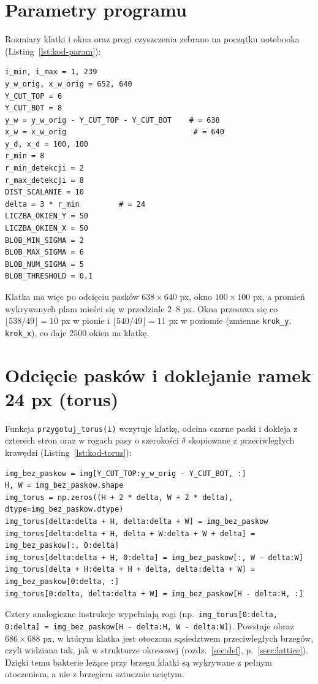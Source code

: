 \documentclass[12pt,a4paper,twoside,openright]{report}
\theoremstyle{definition}
\theoremstyle{remark}
\begin{document}
{\section{Parametry programu}
Rozmiary klatki i okna oraz progi czyszczenia zebrano na początku notebooka (Listing~\ref{lst:kod-param}):
\begin{lstlisting}[style=pykod,caption={Parametry programu: rozmiary klatki i okna oraz progi czyszczenia},label={lst:kod-param}]
i_min, i_max = 1, 239
y_w_orig, x_w_orig = 652, 640
Y_CUT_TOP = 6
Y_CUT_BOT = 8
y_w = y_w_orig - Y_CUT_TOP - Y_CUT_BOT    # = 638
x_w = x_w_orig                             # = 640
y_d, x_d = 100, 100
r_min = 8
r_min_detekcji = 2
r_max_detekcji = 8
DIST_SCALANIE = 10
delta = 3 * r_min         # = 24
LICZBA_OKIEN_Y = 50
LICZBA_OKIEN_X = 50
BLOB_MIN_SIGMA = 2
BLOB_MAX_SIGMA = 6
BLOB_NUM_SIGMA = 5
BLOB_THRESHOLD = 0.1
\end{lstlisting}
Klatka ma więc po odcięciu pasków $638\times640$ px, okno $100\times100$ px, a promień wykrywanych plam mieści się w przedziale $2$--$8$ px. Okna przesuwa się co $\lfloor538/49\rfloor=10$ px w pionie i $\lfloor540/49\rfloor=11$ px w poziomie (zmienne \texttt{krok\_y}, \texttt{krok\_x}), co daje $2500$ okien na klatkę.

\section{Odcięcie pasków i doklejanie ramek 24 px (torus)}
Funkcja \texttt{przygotuj\_torus(i)} wczytuje klatkę, odcina czarne paski i dokleja z czterech stron oraz w rogach pasy o szerokości $\delta$ skopiowane z przeciwległych krawędzi (Listing~\ref{lst:kod-torus}):
\begin{lstlisting}[style=pykod,caption={Odcięcie pasków i doklejanie ramek $\delta=24$ px (budowa torusa)},label={lst:kod-torus}]
img_bez_paskow = img[Y_CUT_TOP:y_w_orig - Y_CUT_BOT, :]
H, W = img_bez_paskow.shape
img_torus = np.zeros((H + 2 * delta, W + 2 * delta), dtype=img_bez_paskow.dtype)
img_torus[delta:delta + H, delta:delta + W] = img_bez_paskow
img_torus[delta:delta + H, delta + W:delta + W + delta] = img_bez_paskow[:, 0:delta]
img_torus[delta:delta + H, 0:delta] = img_bez_paskow[:, W - delta:W]
img_torus[delta + H:delta + H + delta, delta:delta + W] = img_bez_paskow[0:delta, :]
img_torus[0:delta, delta:delta + W] = img_bez_paskow[H - delta:H, :]
\end{lstlisting}
Cztery analogiczne instrukcje wypełniają rogi (np.\ \texttt{img\_torus[0:delta, 0:delta] = img\_bez\_paskow[H - delta:H, W - delta:W]}). Powstaje obraz $686\times688$ px, w którym klatka jest otoczona sąsiedztwem przeciwległych brzegów, czyli widziana tak, jak w strukturze okresowej (rozdz.~\ref{sec:def}, p.~\ref{ssec:lattice}). Dzięki temu bakterie leżące przy brzegu klatki są wykrywane z pełnym otoczeniem, a nie z brzegiem sztucznie uciętym.

}
\end{document}
